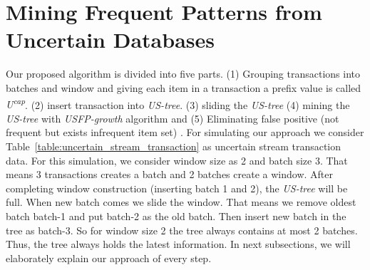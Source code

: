 \section{Mining Frequent Patterns from Uncertain Databases}
    Our proposed algorithm is divided into five parts. (1) Grouping transactions into batches and window and giving each item in a transaction a prefix value is called \emph{U\textsuperscript{cap}}. (2) insert transaction into \emph {US-tree}. (3) sliding the \emph {US-tree} (4) mining the \emph {US-tree} with \emph{USFP-growth} algorithm and (5) Eliminating false positive (not frequent but exists infrequent item set) . For simulating our approach we consider Table~\ref{table:uncertain_stream_transaction} as uncertain stream transaction data. For this simulation, we consider window size as 2 and batch size 3. That means 3 transactions creates a batch and 2 batches create a window. After completing window construction (inserting batch 1 and 2), the \emph {US-tree} will be full. When new batch comes we slide the window. That means we remove oldest batch batch-1 and put batch-2 as the old batch. Then insert new batch in the tree as batch-3. So for window size 2 the tree always contains at most 2 batches. Thus, the tree always holds the latest information. In next subsections, we will elaborately explain our approach of every step.

